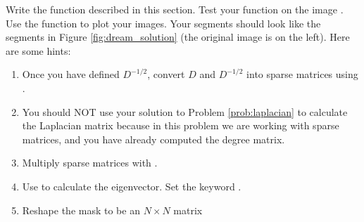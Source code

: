 \begin{problem} Write the function  described in this section.  Test your function on the image . Use the function  to plot your images. Your segments should look like the segments in Figure \ref{fig:dream_solution} (the original image is on the left). Here are some hints:

\begin{enumerate}
\item Once you have defined $D^{-1/2}$, convert $D$ and $D^{-1/2}$ into sparse matrices using .
\item You should NOT use your solution to Problem \ref{prob:laplacian} to calculate the Laplacian matrix because in this problem we are working with sparse matrices, and you have already computed the degree matrix.

\item Multiply sparse matrices with .

\item Use  to calculate the eigenvector. Set the keyword .

\item Reshape the mask to be an $N \times N$ matrix


\end{enumerate}

\end{problem}

